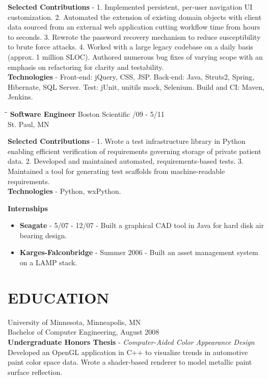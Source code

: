 \documentclass{res}
\begin{document}
\begin{resume}
{\bf Selected Contributions} - 1. Implemented persistent, per-user navigation UI customization. 2. Automated the extension of existing domain objects with client data sourced from an external web application cutting workflow time from hours to seconds. 3. Rewrote the password recovery mechanism to reduce susceptibility to brute force attacks. 4. Worked with a large legacy codebase on a daily basis (approx. 1 million SLOC). Authored numerous bug fixes of varying scope with an emphasis on refactoring for clarity and testability. \\
{\bf Technologies} - Front-end: jQuery, CSS, JSP. Back-end: Java, Struts2, Spring, Hibernate, SQL Server. Test: jUnit, unitils mock, Selenium. Build and CI: Maven, Jenkins.

\vspace{-1em} 
\begin{tabbing}
	\hspace{2.3in}\= \hspace{2.6in}\= \kill
    {\bf Software Engineer} \>Boston Scientific     /09 - 5/11\\
                             \>St. Paul, MN
\end{tabbing}
\vspace{-1.5em}

	{\bf Selected Contributions} - 1. Wrote a test infrastructure library in Python enabling efficient verification of requirements governing storage of private patient data. 2. Developed and maintained automated, requirements-based tests. 3. Maintained a tool for generating test scaffolds from machine-readable requirements. \\
	{\bf Technologies} - Python, wxPython.
	
\vspace{-0.75em}
{\bf Internships}
\begin{itemize} \itemsep -2pt
	\item {\bf Seagate} - 5/07 - 12/07 - Built a graphical CAD tool in Java for hard disk air bearing design.
	\item {\bf Karges-Falconbridge} - Summer 2006 - Built an asset management system on a LAMP stack. 
\end{itemize}

\vspace{-1em}
\section{EDUCATION}
\vspace{0.05in}         
University of Minnesota, Minneapolis, MN \\
Bachelor of Computer Engineering, August 2008 \\
{\bf Undergraduate Honors Thesis} - \emph{Computer-Aided Color Appearance Design} \\
Developed an OpenGL application in C++ to visualize trends in automotive paint color space data. Wrote a shader-based renderer to model metallic paint surface reflection.  
				
\end{resume}
\end{document}
